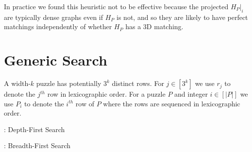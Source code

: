 \documentclass[11pt]{article}
\begin{document}
In practice we found this heuristic not to be effective because the
projected $H_P|_i$ are typically dense graphs even if $H_P$ is not,
and so they are likely to have perfect matchings independently of
whether $H_P$ has a 3D matching.

\section{Generic Search}

\label{app:search}

A width-$k$ puzzle has potentially $3^k$ distinct rows.  For $j \in
[3^k]$ we use $r_j$ to denote the $j^{th}$ row in lexicographic order.
For a puzzle $P$ and integer $i \in [|P|]$ we use $P_i$ to denote the
$i^{th}$ row of $P$ where the rows are sequenced in lexicographic
order.

\begin{algorithm}[h]
  \caption{: Depth-First Search}
  \label{alg:dfs}
\begin{algorithmic}[1]



    \EndIf
  \EndFor


  \EndFunction
\end{algorithmic}
\end{algorithm}

\begin{algorithm}[h]
  \caption{: Breadth-First Search}
  \label{alg:bfs}
\begin{algorithmic}[1]



      \EndIf
    \EndFor
  \EndWhile


  \EndFunction
\end{algorithmic}
\end{algorithm}
\end{document}
